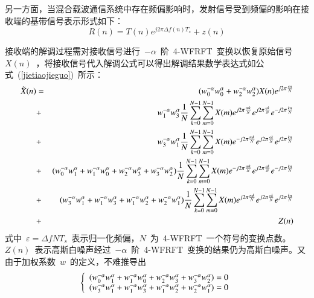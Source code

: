 另一方面，当混合载波通信系统中存在频偏影响时，发射信号受到频偏的影响在接收端的基带信号表示形式如下：
\begin{equation}
R(n) = T(n){e^{j2\pi \Delta f(n){T_s}}} + z(n)
\end{equation}

接收端的解调过程需对接收信号进行~$-\alpha$~阶~4-WFRFT~变换以恢复原始信号~$X(n)$~，将接收信号代入解调公式可以得出解调结果数学表达式如公式~(\ref{jietiaojieguo})~所示：
\begin{eqnarray}\label{jietiaojieguo}
\tilde X(n) &=& (w_0^{ - \alpha }w_0^\alpha  + w_2^{ - \alpha }w_2^\alpha )X(n){e^{j2\pi \frac{{\varepsilon n}}{N}}} \nonumber \\
&+& {\rm{ }}w_1^{ - \alpha }w_3^\alpha \frac{1}{N}\sum\limits_{k = 0}^{N - 1} {\sum\limits_{m = 0}^{N - 1} {X(m){e^{j2\pi \frac{{mk}}{N}}}{e^{j2\pi \frac{{\varepsilon k}}{N}}}{e^{ - j2\pi \frac{{kn}}{N}}}} } \nonumber \\
&+& {\rm{ }}w_3^{ - \alpha }w_1^\alpha \frac{1}{N}\sum\limits_{k = 0}^{N - 1} {\sum\limits_{m = 0}^{N - 1} {X(m){e^{ - j2\pi \frac{{mk}}{N}}}{e^{j2\pi \frac{{\varepsilon k}}{N}}}{e^{j2\pi \frac{{kn}}{N}}}} } \nonumber \\
&+& {\rm{ (}}w_0^{ - \alpha }w_1^\alpha  + w_1^{ - \alpha }w_0^\alpha  + w_2^{ - \alpha }w_3^\alpha  + w_3^{ - \alpha }w_2^\alpha )\frac{1}{N}\sum\limits_{k = 0}^{N - 1} {\sum\limits_{m = 0}^{N - 1} {X(m){e^{ - j2\pi \frac{{mk}}{N}}}{e^{j2\pi \frac{{\varepsilon k}}{N}}}{e^{ - j2\pi \frac{{kn}}{N}}}} } \nonumber \\
&+& {\rm{ (}}w_3^{ - \alpha }w_1^\alpha  + w_1^{ - \alpha }w_3^\alpha  + w_1^{ - \alpha }w_2^\alpha  + w_2^{ - \alpha }w_1^\alpha )\frac{1}{N}\sum\limits_{k = 0}^{N - 1} {\sum\limits_{m = 0}^{N - 1} {X(m){e^{j2\pi \frac{{mk}}{N}}}{e^{j2\pi \frac{{\varepsilon k}}{N}}}{e^{j2\pi \frac{{kn}}{N}}}} } \nonumber \\
&+& Z(n)
\end{eqnarray}
式中~$\varepsilon  = \Delta fN{T_s}$~表示归一化频偏，$N$~为~4-WFRFT~一个符号的变换点数。~$Z(n)$~表示高斯白噪声经过~$-\alpha$~阶~4-WFRFT~变换的结果仍为高斯白噪声。又由于加权系数~$w$~的定义，不难推导出
\begin{equation}
\left\{ \begin{array}{l}
{\rm{(}}w_0^{ - \alpha }w_1^\alpha  + w_1^{ - \alpha }w_0^\alpha  + w_2^{ - \alpha }w_3^\alpha  + w_3^{ - \alpha }w_2^\alpha ) = 0\\
{\rm{(}}w_3^{ - \alpha }w_1^\alpha  + w_1^{ - \alpha }w_3^\alpha  + w_1^{ - \alpha }w_2^\alpha  + w_2^{ - \alpha }w_1^\alpha ) = 0
\end{array} \right.
\end{equation}
